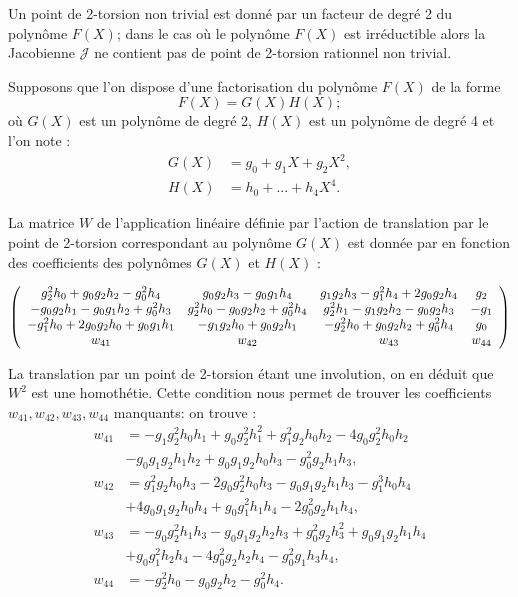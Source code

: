 \documentclass[a4paper,12pt]{article}
\theoremstyle{definition}
\theoremstyle{remark}
\numberwithin{equation}{section}
\begin{document}
Un point de 2-torsion non trivial est donné par un facteur de degré 2 du polynôme $F(X)$; dans le cas où le polynôme $F(X)$ est irréductible alors la Jacobienne $\mathcal{J}$ ne contient pas de point de 2-torsion rationnel non trivial.

Supposons que l'on dispose d'une factorisation du polynôme $F(X)$ de la forme
$$F(X) = G(X)H(X);$$
où $G(X)$ est un polynôme de degré 2, $H(X)$ est un polynôme de degré 4 et l'on note :
\begin{align*}
G(X) &= g_0 + g_1X + g_2X^2, \\
H(X) &= h_0 + ... + h_4X^4.
\end{align*}

La matrice $W$ de l'application linéaire définie par l'action de translation par le point de 2-torsion correspondant au polynôme $G(X)$ est donnée par \citet{eqKum} en fonction des coefficients des polynômes $G(X)$ et $H(X)$ :

\[ \left(
  \begin{array}{ c c c c}
     g_2^2h_0 + g_0g_2h_2 - g_0^2h_4 & g_0g_2h_3 - g_0g_1h_4 & g_1g_2h_3 - g_1^2h_4 + 2g_0g_2h_4  & g_2  \\
     -g_0g_2h_1 - g_0g_1h_2 + g_0^2h_3 & g_2^2h_0 - g_0g_2h_2 + g_0^2h_4  & g_2^2h_1 - g_1g_2h_2 - g_0g_2h_3  & -g_1  \\
     -g_1^2h_0 + 2g_0g_2h_0 + g_0g_1h_1 & -g_1g_2h_0 + g_0g_2h_1  & -g_2^2h_0 + g_0g_2h_2 + g_0^2h_4  & g_0 \\
     w_{41} & w_{42}   & w_{43}  & w_{44}  \\
  \end{array} \right)
\]

La translation par un point de 2-torsion étant une involution, on en déduit que $W^2$ est une homothétie. Cette condition nous permet de trouver les coefficients $w_{41},w_{42} ,w_{43},w_{44}$ manquants: on trouve :
\begin{align*}
w_{41} &= -g_1g_2^2h_0h_1 + g_0g_2^2h_1^2 + g_1^2g_2h_0h_2 - 4g_0g_2^2h_0h_2 \\
    &   -g_0g_1g_2h_1h_2 + g_0g_1g_2h_0h_3 - g_0^2g_2h_1h_3,      \\
w_{42} &= g_1^2g_2h_0h_3 - 2g_0g_2^2h_0h_3 - g_0g_1g_2h_1h_3 - g_1^3h_0h_4 \\
    &+ 4g_0g_1g_2h_0h_4 + g_0g_1^2h_1h_4 - 2g_0^2g_2h_1h_4,     \\
w_{43} &= -g_0g_2^2h_1h_3 - g_0g_1g_2h_2h_3 + g_0^2g_2h_3^2 + g_0g_1g_2h_1h_4 \\
    & + g_0g_1^2h_2h_4 - 4g_0^2g_2h_2h_4 - g_0^2g_1h_3h_4,        \\        
w_{44} &= -g_2^2h_0 - g_0g_2h_2 - g_0^2h_4.
\end{align*}
\end{document}
